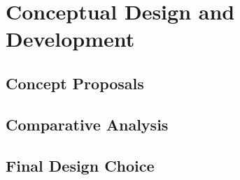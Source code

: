 \section{Conceptual Design and Development}
  \subsection{Concept Proposals}
  \subsection{Comparative Analysis}
  \subsection{Final Design Choice}